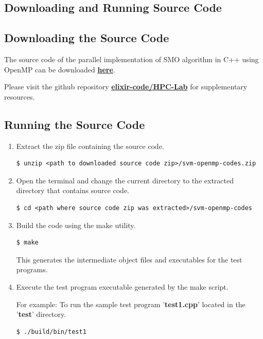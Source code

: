 \documentclass{article}
\begin{document}
\begin{appendices}
	\section{Downloading and Running Source Code}
		\subsection{Downloading the Source Code}
			The source code of the parallel implementation of SMO algorithm in C++ using OpenMP can be downloaded \href{https://github.com/elixir-code/HPC-Lab/Project/SVM-OpenMP/svm-openmp-codes.zip}{\textbf{here}}. 
			
			Please visit the github repository \href{https://github.com/elixir-code/HPC-Lab/}{\textbf{elixir-code/HPC-Lab}} for supplementary resources.
			
		\subsection{Running the Source Code}
			\begin{enumerate}
				\item Extract the zip file containing the source code.				
					\begin{lstlisting}[style=BashStyle]
$ unzip <path to downloaded source code zip>/svm-openmp-codes.zip
					\end{lstlisting}
				
				\item Open the terminal and change the current directory to the extracted directory that contains source code.
					\begin{lstlisting}[style=BashStyle]
$ cd <path where source code zip was extracted>/svm-openmp-codes
					\end{lstlisting}
			
				\item Build the code using the make utility.
				\begin{lstlisting}[style=BashStyle]
$ make
			\end{lstlisting}
				
				This generates the intermediate object files and executables for the test programs.
				
				\item Execute the test program executable generated by the make script.
				
					For example: To run the sample test program '\textbf{test1.cpp}' located in the '\textbf{test}' directory.
					\begin{lstlisting}[style=BashStyle]
$ ./build/bin/test1
					\end{lstlisting}
					

\end{enumerate}
\end{appendices}
\end{document}
